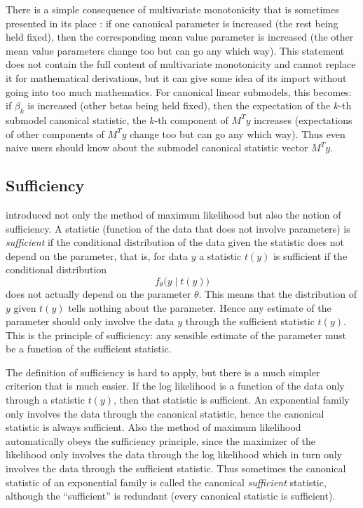 \documentclass[11pt]{article}
\begin{document}
There is a simple consequence of multivariate monotonicity that is sometimes
presented in its place \citep[discussion section]{gws}: if one canonical parameter is increased (the rest being held fixed), then the corresponding mean value
parameter is increased (the other mean value parameters change too but can go
any which way).  This statement does not contain the full content of
multivariate monotonicity and cannot replace it for mathematical derivations,
but it can give some idea of its import without going into too much mathematics.
For canonical linear submodels, this becomes: if $\beta_k$ is increased (other
betas being held fixed), then the expectation of the $k$-th submodel canonical
statistic, the $k$-th component of $M^T y$ increases (expectations of other
components of $M^T y$ change too but can go any which way).  Thus even naive
users should know about the submodel canonical statistic vector $M^T y$.

\subsection{Sufficiency} \label{sec:sufficient}

\citet{fisher} introduced not only the method of maximum likelihood but also
the notion of sufficiency.  A statistic (function of the data that does not
involve parameters) is \emph{sufficient} if the conditional distribution of
the data given the statistic does not depend on the parameter, that is,
for data $y$ a statistic $t(y)$ is sufficient if the conditional distribution
$$
   f_\theta\bigl(y \mid t(y)\bigr)
$$
does not actually depend on the parameter $\theta$.  This means that the
distribution of $y$ given $t(y)$ tells nothing about the parameter.  Hence
any estimate of the parameter should only involve the data $y$ through the
sufficient statistic $t(y)$.  This is the principle of sufficiency: any
sensible estimate of the parameter must be a function of the sufficient
statistic.

The definition of sufficiency is hard to apply, but there is a much simpler
criterion that is much easier.  If the log likelihood is a function
of the data only through a statistic $t(y)$, then that statistic is sufficient.
An exponential family only involves the data through the canonical statistic,
hence the canonical statistic is always sufficient.  Also the method of maximum
likelihood automatically obeys the sufficiency principle, since the maximizer
of the likelihood only involves the data through the log likelihood which
in turn only involves the data through the sufficient statistic.  Thus
sometimes the canonical statistic of an exponential family is called
the canonical \emph{sufficient} statistic, although the ``sufficient'' is
redundant (every canonical statistic is sufficient).
\end{document}
